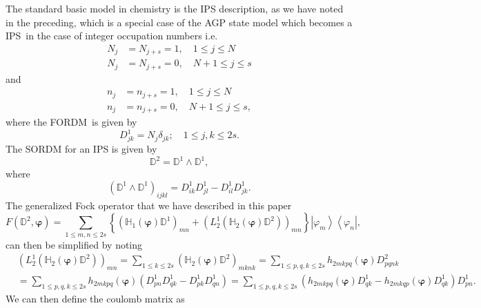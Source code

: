 \documentclass[titlepage]{article}%
\begin{document}
The standard basic model in chemistry is the IPS description, as we have noted
in the preceding, which is a special case of the AGP state model which becomes
a IPS\ in the case of integer occupation numbers i.e.
\begin{align}
N_{j}  &  =N_{j+s}=1,\quad1\leq j\leq N\nonumber\\
N_{j}  &  =N_{j+s}=0,\quad N+1\leq j\leq s
\end{align}
and%
\begin{align}
n_{j}  &  =n_{j+s}=1,\quad1\leq j\leq N\nonumber\\
n_{j}  &  =n_{j+s}=0,\quad N+1\leq j\leq s,
\end{align}
where the FORDM\ is given by
\begin{equation}
D_{jk}^{1}=N_{j}\delta_{jk};\quad1\leq j,k\leq2s.
\end{equation}
The SORDM for an IPS is given by
\begin{equation}
\mathbb{D}^{2}=\mathbb{D}^{1}\wedge\mathbb{D}^{1},
\end{equation}
where
\begin{equation}
\left(  \mathbb{D}^{1}\wedge\mathbb{D}^{1}\right)  _{ijkl}=D_{ik}^{1}%
D_{jl}^{1}-D_{il}^{1}D_{jk}^{1}.
\end{equation}
The generalized Fock operator that we have described in this paper
\begin{equation}
F\left(  \mathbb{D}^{2},\bm{\varphi}\right)  =\sum_{1\leq m,n\leq2s}\left\{
\left(  \mathbb{H}_{1}\left(  \bm{\varphi}\right)  \mathbb{D}^{1}\right)
_{mn}+\left(  L_{2}^{1}\left(  \mathbb{H}_{2}\left(  \bm{\varphi}\right)
\mathbb{D}^{2}\right)  \right)  _{mn}\right\}  \left\vert \varphi
_{m}\right\rangle \left\langle \varphi_{n}\right\vert , \label{F1}%
\end{equation}
can then be simplified by noting
\begin{align}
&  \left(  L_{2}^{1}\left(  \mathbb{H}_{2}\left(  \bm{\varphi}\right)
\mathbb{D}^{2}\right)  \right)  _{mn}=\sum_{1\leq k\leq2s}\left(
\mathbb{H}_{2}\left(  \bm{\varphi}\right)  \mathbb{D}^{2}\right)  _{mknk}%
=\sum_{1\leq p,q,k\leq2s}h_{2mkpq}\left(  \bm{\varphi}\right)  D_{pqnk}%
^{2}\nonumber\\
&  =\sum_{1\leq p,q,k\leq2s}h_{2mkpq}\left(  \bm{\varphi}\right)  \left(
D_{pn}^{1}D_{qk}^{1}-D_{pk}^{1}D_{qn}^{1}\right)  =\sum_{1\leq p,q,k\leq
2s}\left(  h_{2mkpq}\left(  \bm{\varphi}\right)  D_{qk}^{1}-h_{2mkqp}\left(
\bm{\varphi}\right)  D_{qk}^{1}\right)  D_{pn}^{1}.
\end{align}
We can then define the coulomb matrix as
\end{document}
